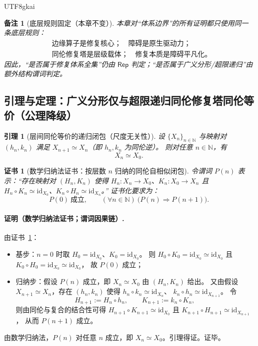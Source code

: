 \documentclass[12pt]{article}
\newtheorem{lemma}{引理}[section]
\newtheorem{remark}{备注}[section]
\newtheorem{Certificate}{证书}[section]
\newcommand{\NN}{\mathbb{N}}
\begin{document}
\begin{CJK*}{UTF8}{gkai}
\begin{remark}[底层规则固定（本章不变）]
本章对“体系边界”的所有证明都只使用同一条底层规则：
\[
  \begin{aligned}
    &\text{边缘算子是修复核心；}\quad \text{障碍是原生驱动力；}\\
    &\text{同伦修复塔是层级载体；}\quad \text{修复本质是障碍平凡化。}
  \end{aligned}
\]
因此，“是否属于修复体系全集”仍由 $\mathsf{Rep}$ 判定；“是否属于广义分形/超限递归”由额外结构谓词判定。
\end{remark}

\subsection{引理与定理：广义分形仅与超限递归同伦修复塔同伦等价（公理降级）}
\label{subsec:tex29-fractal-omega-equivalence}

\begin{lemma}[层间同伦等价的递归闭包（尺度无关性）]
\label{lem:tex29-homotopy-closure-by-induction}
设 $\{X_n\}_{n\in\NN}$ 与映射对 $(h_n,k_n)$ 满足 $X_{n+1}\simeq X_n$（即 $h_n,k_n$ 为同伦逆）。
则对任意 $n\in\NN$，有
\[
  X_n\simeq X_0.
\]
\end{lemma}

\begin{Certificate}[数学归纳法证书：按层数 $n$ 归纳的同伦自相似闭包]
\label{cert:tex29-homotopy-closure-by-induction}
令谓词 $P(n)$ 表示：“存在映射对 $(H_n,K_n)$ 使得 $H_n:X_n\to X_0$、$K_n:X_0\to X_n$ 且
$H_n\circ K_n\simeq \mathrm{id}_{X_0}$、$K_n\circ H_n\simeq \mathrm{id}_{X_n}$。”
证书化要求为：
\[
  P(0)\ \text{成立},\qquad (\forall n\in\NN)\ \bigl(P(n)\Rightarrow P(n+1)\bigr).
\]
\end{Certificate}

\paragraph{证明（数学归纳法证书；谓词因果链）.}
由证书~\ref{cert:tex29-homotopy-closure-by-induction}：
\begin{itemize}
  \item 基步：$n=0$ 时取 $H_0=\mathrm{id}_{X_0}$、$K_0=\mathrm{id}_{X_0}$。
  则 $H_0\circ K_0=\mathrm{id}_{X_0}\simeq \mathrm{id}_{X_0}$ 且 $K_0\circ H_0=\mathrm{id}_{X_0}\simeq \mathrm{id}_{X_0}$，
  故 $P(0)$ 成立；
  \item 归纳步：假设 $P(n)$ 成立，即 $X_n\simeq X_0$ 由 $(H_n,K_n)$ 给出。
  又由假设 $X_{n+1}\simeq X_n$，存在 $(h_n,k_n)$ 使得 $h_n\circ k_n\simeq \mathrm{id}_{X_n}$、
  $k_n\circ h_n\simeq \mathrm{id}_{X_{n+1}}$。
  令
  \[
    H_{n+1}:=H_n\circ h_n,\qquad
    K_{n+1}:=k_n\circ K_n,
  \]
  则由同伦与复合的结合性可得 $H_{n+1}\circ K_{n+1}\simeq \mathrm{id}_{X_0}$ 且 $K_{n+1}\circ H_{n+1}\simeq \mathrm{id}_{X_{n+1}}$，
  从而 $P(n+1)$ 成立。
\end{itemize}
由数学归纳法，$P(n)$ 对任意 $n$ 成立，即 $X_n\simeq X_0$。引理得证。证毕。


\end{CJK*}
\end{document}
